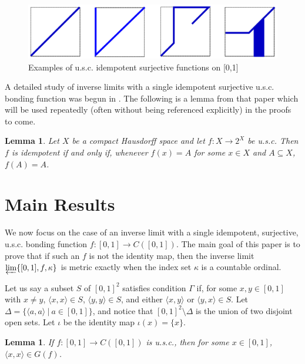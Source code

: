 \documentclass{amsart}
\newtheorem{lemma}[theorem]{Lemma}
\theoremstyle{definition}
\newcommand{\<}{\langle}
\renewcommand{\>}{\rangle}
\begin{document}
\begin{figure}
\begin{center}
\includegraphics[width=\linewidth]{idempotent_usc.pdf}
\end{center}
\caption{Examples of u.s.c. idempotent surjective functions on [0,1]}
\label{idempotentUsc}
\end{figure}

A detailed study of inverse limits with a single idempotent surjective u.s.c. bonding function was begun in \cite{varagona}. The following is a lemma from that paper which will be used repeatedly (often without being referenced explicitly) in the proofs to come.

\begin{lemma} \label{idemlemma}  Let $X$ be a compact Hausdorff space and let $f: X \rightarrow 2^{X}$ be u.s.c. Then $f$ is idempotent if and only if, whenever $f(x) = A$ for some $x \in X$ and $A \subseteq X$, $f(A) = A$.
\end{lemma}

\section{Main Results}

We now focus on the case of an inverse limit with a single idempotent, surjective, u.s.c. bonding function $f: [0,1] \rightarrow C([0,1])$. The main goal of this paper is to prove that if such an $f$ is not the identity map, then the inverse limit $\varprojlim \{[0,1], f, \kappa\}$ is metric exactly when the index set $\kappa$ is a countable ordinal.

Let us say a subset $S$ of $[0,1]^2$ satisfies condition $\Gamma$ if, for some $x, y \in [0,1]$ with $x \ne y$, $\<x,x\> \in S$, $\<y,y\> \in S$, and either $\<x,y\>$ or $\<y,x\> \in S$. Let $\Delta = \{\<a,a\> \ | \ a \in [0,1]\}$, and notice that $[0,1]^2 \setminus \Delta$ is the union of two disjoint open sets. Let $\iota$ be the identity map $\iota(x)=\{x\}$.

\begin{lemma}
If $f: [0,1] \rightarrow C([0,1])$ is u.s.c., then for some $x \in [0,1]$, $\<x,x\> \in G(f)$.
\end{lemma}
\end{document}

